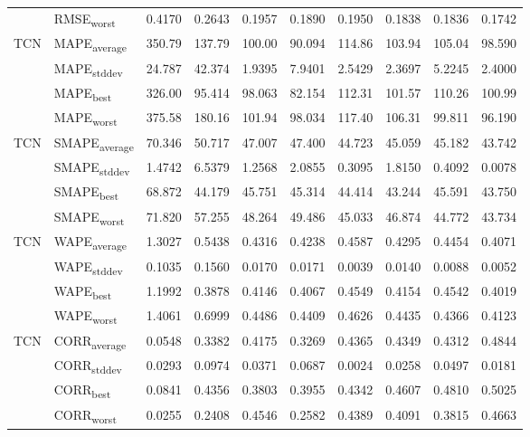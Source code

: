 {\begin{longtable}{l l c c c c c c c c}
 & RMSE\textsubscript{worst} & 0.4170 & 0.2643 & 0.1957 & 0.1890 & 0.1950 & 0.1838 & 0.1836 & 0.1742 \\
\cmidrule(lr){2-10}
\multirow{4}{*}{TCN} & MAPE\textsubscript{average} & 350.79 & 137.79 & 100.00 & 90.094 & 114.86 & 103.94 & 105.04 & 98.590 \\
 & MAPE\textsubscript{stddev} & 24.787 & 42.374 & 1.9395 & 7.9401 & 2.5429 & 2.3697 & 5.2245 & 2.4000 \\
 & MAPE\textsubscript{best} & 326.00 & 95.414 & 98.063 & 82.154 & 112.31 & 101.57 & 110.26 & 100.99 \\
 & MAPE\textsubscript{worst} & 375.58 & 180.16 & 101.94 & 98.034 & 117.40 & 106.31 & 99.811 & 96.190 \\
\cmidrule(lr){2-10}
\multirow{4}{*}{TCN} & SMAPE\textsubscript{average} & 70.346 & 50.717 & 47.007 & 47.400 & 44.723 & 45.059 & 45.182 & 43.742 \\
 & SMAPE\textsubscript{stddev} & 1.4742 & 6.5379 & 1.2568 & 2.0855 & 0.3095 & 1.8150 & 0.4092 & 0.0078 \\
 & SMAPE\textsubscript{best} & 68.872 & 44.179 & 45.751 & 45.314 & 44.414 & 43.244 & 45.591 & 43.750 \\
 & SMAPE\textsubscript{worst} & 71.820 & 57.255 & 48.264 & 49.486 & 45.033 & 46.874 & 44.772 & 43.734 \\
\cmidrule(lr){2-10}
\multirow{4}{*}{TCN} & WAPE\textsubscript{average} & 1.3027 & 0.5438 & 0.4316 & 0.4238 & 0.4587 & 0.4295 & 0.4454 & 0.4071 \\
 & WAPE\textsubscript{stddev} & 0.1035 & 0.1560 & 0.0170 & 0.0171 & 0.0039 & 0.0140 & 0.0088 & 0.0052 \\
 & WAPE\textsubscript{best} & 1.1992 & 0.3878 & 0.4146 & 0.4067 & 0.4549 & 0.4154 & 0.4542 & 0.4019 \\
 & WAPE\textsubscript{worst} & 1.4061 & 0.6999 & 0.4486 & 0.4409 & 0.4626 & 0.4435 & 0.4366 & 0.4123 \\
\cmidrule(lr){2-10}
\multirow{4}{*}{TCN} & CORR\textsubscript{average} & 0.0548 & 0.3382 & 0.4175 & 0.3269 & 0.4365 & 0.4349 & 0.4312 & 0.4844 \\
 & CORR\textsubscript{stddev} & 0.0293 & 0.0974 & 0.0371 & 0.0687 & 0.0024 & 0.0258 & 0.0497 & 0.0181 \\
 & CORR\textsubscript{best} & 0.0841 & 0.4356 & 0.3803 & 0.3955 & 0.4342 & 0.4607 & 0.4810 & 0.5025 \\
 & CORR\textsubscript{worst} & 0.0255 & 0.2408 & 0.4546 & 0.2582 & 0.4389 & 0.4091 & 0.3815 & 0.4663 \\

\end{longtable}}

